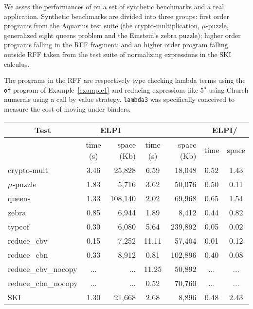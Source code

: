 \documentclass{llncs}
\begin{document}
We asses the performances of \elpi{} on a set of synthetic benchmarks and
a real application.  Synthetic benchmarks are divided into three groups:
first order programs from the Aquarius test suite (the
crypto-multiplication, $\mu$-puzzle,
generalized eight queens problem and the Einstein's zebra puzzle);
higher order programs falling in the RFF fragment; and an higher
order program falling outside RFF taken from the test suite of
\tedius{} normalizing expressions in the SKI calculus.

The programs in the RFF are respectively type checking lambda terms using
the \verb+of+ program of Example~\ref{example1} and reducing expressions like
$5^5$ using Church numerals using a call by value strategy. \verb+lambda3+ was
specifically conceived to measure the cost of moving under binders.

\begin{center}
  \scriptsize 
  \begin{tabular}{|p{1.5cm}||c|r||c|r||c|c|}
    \hline
      \multicolumn{1}{|c||}{Test} &
      \multicolumn{2}{|c||}{ELPI} &
      \multicolumn{2}{|c||}{\tedius{}} &
      \multicolumn{2}{|c|}{ELPI/\tedius{}} \\
    \hline
    &  time (s)     & space (Kb)  & time (s) & space (Kb) &  time & space \\
    
    \hline
    \hline
    crypto-mult &  3.46 & 25,828  & 6.59 & 18,048 &  0.52 & 1.43 \\
    \hline    
    $\mu$-puzzle &  1.83 & 5,716 &  3.62 & 50,076 &  0.50 & 0.11 \\
    \hline
    queens &  1.33  & 108,140 &  2.02 & 69,968 &  0.65 & 1.54 \\
    \hline    
    zebra &  0.85 & 6,944 &  1.89 & 8,412 &  0.44 & 0.82 \\
    \hline     
    \hline
    typeof &  0.30 & 6,080 &  5.64 & 239,892 &  0.05 & 0.02 \\
    \hline
    reduce\_cbv &  0.15 & 7,252 &  11.11 & 57,404  & 0.01 & 0.12 \\
    \hline
    reduce\_cbn &  0.33 & 8,912 &  0.81 & 102,896  & 0.40 & 0.08 \\
    \hline
    reduce\_cbv\_nocopy & ... & ... &  11.25 & 50,892  & ... & ... \\
    \hline
    reduce\_cbn\_nocopy & ... & ... &  0.52 & 70,760  & ... & ... \\
    \hline
    \hline
    SKI &  1.30 & 21,668 &  2.68 & 8,896  & 0.48 & 2.43 \\
    \hline
    
  \end{tabular}
\end{center}
\end{document}
